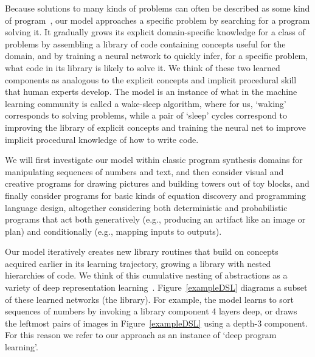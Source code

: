 \documentclass{article}
\begin{document}
Because solutions to many kinds of problems can often be described as
some kind of
program~\cite{lake2015human,Ullman2012,DBLP:journals/cogsr/SchmidK11},
our model approaches a specific problem by searching for a program solving
it. It gradually grows its explicit domain-specific knowledge for a
class of problems by assembling a library of code containing concepts
useful for the domain, and by training a neural network to quickly
infer, for a specific problem, what code in its library is likely to
solve it. We think of these two learned components as analogous to the
explicit concepts and implicit procedural skill that human experts
develop.  The model is an instance of what in the machine learning
community is called a wake-sleep algorithm, where for us, `waking'
corresponds to solving problems, while a pair of `sleep' cycles
correspond to improving the library of explicit concepts and training
the neural net to improve implicit procedural knowledge of how to
write code.


We will first investigate our model within classic program
synthesis domains for manipulating sequences of numbers and text, and
then consider visual and creative programs for drawing pictures and
building towers out of toy blocks, and finally consider programs for basic kinds of equation discovery and programming language design, altogether considering both
deterministic and probabilistic programs that act both generatively
(e.g., producing an artifact like an image or plan) and conditionally
(e.g., mapping inputs to outputs).

Our model iteratively creates new library routines that build on
concepts acquired earlier in its learning trajectory, growing a library with nested
hierarchies of code.  We think of this cumulative nesting of
abstractions as a variety of deep representation
learning~\cite{lecun2015deep}.  Figure~\ref{exampleDSL} diagrams a
subset of these learned networks (the library). For example, the model
learns to sort sequences of numbers by invoking a library component 4
layers deep, or draws the leftmost pairs of images in
Figure~\ref{exampleDSL} using a depth-3 component.  For this reason we
refer to our approach as an instance of `deep program learning'.
\end{document}
